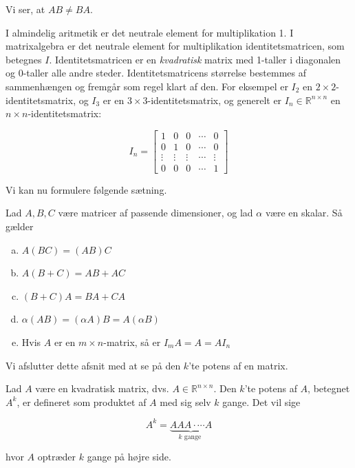 \begin{solution}
    Vi ser, at $AB \neq BA$. \end{solution}

    I almindelig aritmetik er det neutrale element for multiplikation 1. I matrixalgebra er det neutrale element for multiplikation identitetsmatricen, som betegnes $I$. Identitetsmatricen er en \textit{kvadratisk} matrix med 1-taller i diagonalen og 0-taller alle andre steder. Identitetsmatricens størrelse bestemmes af sammenhængen og fremgår som regel klart af den. For eksempel er $I_2$ en $2 \times 2$-identitetsmatrix, og $I_3$ er en $3 \times 3$-identitetsmatrix, og generelt er $I_n \in \mathbb{R}^{n \times n}$ en $n \times n$-identitetsmatrix:

    $$
    I_n=\left[\begin{array}{ccccc}
    1 & 0 & 0 & \cdots & 0 \\
    0 & 1 & 0 & \cdots & 0 \\
    \vdots & \vdots & \vdots & \cdots & \vdots \\
    0 & 0 & 0 & \cdots & 1
    \end{array}\right]
    $$

    Vi kan nu formulere følgende sætning.

    \begin{theorem}
        Lad $A, B, C$ være matricer af passende dimensioner, og lad $\alpha$ være en skalar. Så gælder
\begin{enumerate}[(a)]
    \item $A(BC) = (AB)C$
    \item $A(B + C) = AB + AC$
    \item $(B + C)A = BA + CA$
    \item $\alpha(AB) = (\alpha A)B = A(\alpha B)$
    \item Hvis $A$ er en $m\times n$-matrix, så er $I_m A=A=AI_n$
\end{enumerate}
\end{theorem}

Vi afslutter dette afsnit med at se på den $k$'te potens af en matrix.

\begin{definition}
    Lad $A$ være en kvadratisk matrix, dvs. $ A \in \mathbb{R}^{n \times n}$. Den $k$'te potens af $A$, betegnet $A^k$, er defineret som produktet af $A$ med sig selv $k$ gange. Det vil sige

    $$
    A^k=\underbrace{ AAA \cdot \cdots A}_{k \text { gange }}
    $$

    hvor $A$ optræder $k$ gange på højre side.
\end{definition}

